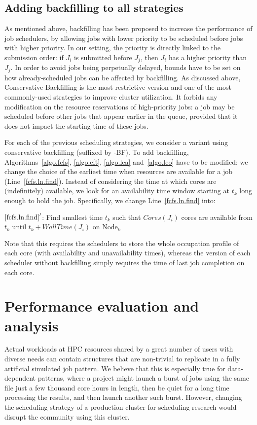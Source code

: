 \documentclass[sigconf,review,anonymous]{acmart}
\newcommand{\Node}[1]{\ensuremath{\mathrm{Node}_{#1}}\xspace}
\newcommand{\core}{\mathit{Cores}\xspace}
\newcommand{\walltime}{\mathit{WallTime}\xspace}
\begin{document}
\subsection{Adding backfilling to all strategies}

As mentioned above, backfilling has been proposed to increase the
performance of job schedulers, by allowing jobs with lower priority to be
scheduled before jobs with higher priority. In our setting, the
priority is directly linked to the submission order: if $J_i$ is
submitted before $J_j$, then $J_i$ has a higher priority than $J_j$.
In order to avoid jobs
being perpetually delayed, bounds have to be set on how already-scheduled
jobs can be affected by backfilling. As discussed above,
Conservative Backfilling is the most restrictive version and one of
the most commonly-used strategies to improve cluster utilization. It
forbids any modification on the resource
reservations of high-priority jobs: a job may be scheduled
before other jobs that appear earlier in the queue, provided that it
does not impact the starting time of these jobs.


For each of the previous scheduling strategies, we consider a variant
using conservative backfilling (suffixed by -BF).  To add
backfilling, Algorithms~\ref{algo.fcfs}, \ref{algo.eft},
\ref{algo.lea} and~\ref{algo.leo} have to be modified: we change the
choice of the earliest time when resources are available for a job
(Line~\ref{fcfs.ln.find}). Instead of considering the time at which
cores are (indefinitely) available, we look for an availability time
window starting at $t_k$ long enough to hold the
job. Specifically, we change Line~\ref{fcfs.ln.find} into:
\begin{algorithmic}[0]
  \State $\ref{fcfs.ln.find}'$: Find smallest time $t_k$ such that $\core(J_i)$ cores are
  available from $t_k$ until $t_k + \walltime(J_i)$ on $\Node{k}$
\end{algorithmic}

Note that this requires the schedulers to store  the whole occupation profile of
each core (with availability and unavailability times), whereas the
version of each scheduler without backfilling simply requires the time
of last job completion on each core.

\section{Performance evaluation and analysis}\label{sec.evaluations}

Actual workloads at HPC resources shared by a great number of users with diverse needs can contain structures
that are non-trivial to replicate in a fully artificial simulated job pattern. We believe that this is especially
true for data-dependent patterns, where a project might launch a burst of jobs using the same file just a few thousand
core hours in length, then be quiet for a long time processing the results, and then launch another such burst.
However, changing the scheduling strategy of a production cluster for
scheduling research would disrupt the community using this cluster.
\end{document}
